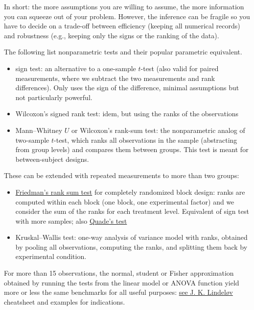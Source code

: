 \documentclass[
  11pt,
  letterpaper,
]{scrbook}
\providecommand{\tightlist}{%
  \setlength{\itemsep}{0pt}\setlength{\parskip}{0pt}}\usepackage{longtable,booktabs,array}
\theoremstyle{definition}
\theoremstyle{definition}
\theoremstyle{remark}
\begin{document}
In short: the more assumptions you are willing to assume, the more
information you can squeeze out of your problem. However, the inference
can be fragile so you have to decide on a trade-off between efficiency
(keeping all numerical records) and robustness (e.g., keeping only the
signs or the ranking of the data).

The following list nonparametric tests and their popular parametric
equivalent.

\begin{itemize}
\tightlist
\item
  sign test: an alternative to a one-sample \(t\)-test (also valid for
  paired measurements, where we subtract the two measurements and rank
  differences). Only uses the sign of the difference, minimal
  assumptions but not particularly powerful.
\item
  Wilcoxon's signed rank test: idem, but using the ranks of the
  observations
\item
  Mann--Whitney \(U\) or Wilcoxon's rank-sum test: the nonparametric
  analog of two-sample \(t\)-test, which ranks all observations in the
  sample (abstracting from group levels) and compares them between
  groups. This test is meant for between-subject designs.
\end{itemize}

These can be extended with repeated measurements to more than two
groups:

\begin{itemize}
\tightlist
\item
  \href{https://www.itl.nist.gov/div898/software/dataplot/refman1/auxillar/friedman.htm}{Friedman's
  rank sum test} for completely randomized block design: ranks are
  computed within each block (one block, one experimental factor) and we
  consider the sum of the ranks for each treatment level. Equivalent of
  sign test with more samples; also
  \href{https://www.itl.nist.gov/div898/software/dataplot/refman1/auxillar/quade.htm}{Quade's
  test}
\item
  Kruskal--Wallis test: one-way analysis of variance model with ranks,
  obtained by pooling all observations, computing the ranks, and
  splitting them back by experimental condition.
\end{itemize}

For more than 15 observations, the normal, student or Fisher
approximation obtained by running the tests from the linear model or
ANOVA function yield more or less the same benchmarks for all useful
purposes: \href{https://lindeloev.github.io/tests-as-linear/}{see J. K.
Lindeløv} cheatsheet and examples for indications.
\end{document}
